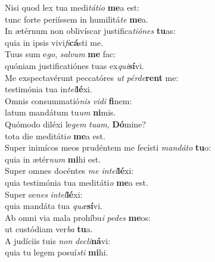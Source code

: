 \evenverse Nisi quod lex tua medi\textit{tá}\textit{ti}\textit{o} \textbf{me}a est:~\*\\
\evenverse tunc forte periíssem in humilitá\textit{te} \textbf{me}a.\\
\oddverse In ætérnum non oblivíscar justifica\textit{ti}\textit{ó}\textit{nes} \textbf{tu}as:~\*\\
\oddverse quia in ipsis vivi\textit{fi}\textbf{cá}sti me.\\
\evenverse Tuus sum e\textit{go}, \textit{sal}\textit{vum} \textbf{me} fac:~\*\\
\evenverse quóniam justificatiónes tuas ex\textit{qui}\textbf{sí}vi.\\
\oddverse Me exspectavérunt peccatóres \textit{ut} \textit{pér}\textit{de}\textbf{rent} me:~\*\\
\oddverse testimónia tua in\textit{tel}\textbf{lé}xi.\\
\evenverse Omnis consummatió\textit{nis} \textit{vi}\textit{di} \textbf{fi}nem:~\*\\
\evenverse latum mandátum tu\textit{um} \textbf{ni}mis.\\
\oddverse Quómodo diléxi le\textit{gem} \textit{tu}\textit{am}, \textbf{Dó}mine?~\*\\
\oddverse tota die meditáti\textit{o} \textbf{me}a est.\\
\evenverse Super inimícos meos prudéntem me fecísti \textit{man}\textit{dá}\textit{to} \textbf{tu}o:~\*\\
\evenverse quia in ætér\textit{num} \textbf{mi}hi est.\\
\oddverse Super omnes docéntes \textit{me} \textit{in}\textit{tel}\textbf{lé}xi:~\*\\
\oddverse quia testimónia tua meditáti\textit{o} \textbf{me}a est.\\
\evenverse Super se\textit{nes} \textit{in}\textit{tel}\textbf{lé}xi:~\*\\
\evenverse quia mandáta tua \textit{quæ}\textbf{sí}vi.\\
\oddverse Ab omni via mala prohíbu\textit{i} \textit{pe}\textit{des} \textbf{me}os:~\*\\
\oddverse ut custódiam ver\textit{ba} \textbf{tu}a.\\
\evenverse A judíciis tuis \textit{non} \textit{de}\textit{cli}\textbf{ná}vi:~\*\\
\evenverse quia tu legem posuí\textit{sti} \textbf{mi}hi.\\
